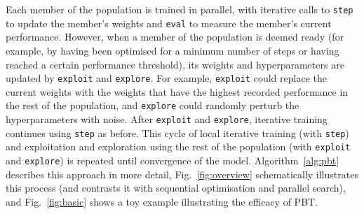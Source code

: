 \documentclass{article} %
\newcommand{\figref}[1]{Fig.~\ref{#1}}
\newcommand{\pbtexploit}{\texttt{exploit}\xspace}
\newcommand{\pbtexplore}{\texttt{explore}\xspace}
\newcommand{\pbtstep}{\texttt{step}\xspace}
\newcommand{\pbteval}{\texttt{eval}\xspace}
\begin{document}
Each member of the population is trained in parallel, with iterative calls to \pbtstep to update the member's weights and \pbteval to measure the member's current performance. However, when a member of the population is deemed ready (for example, by having been optimised for a minimum number of steps or having reached a certain performance threshold), its weights and hyperparameters are updated by \pbtexploit and \pbtexplore. For example, \pbtexploit could replace the current weights with the weights that have the highest recorded performance in the rest of the population, and \pbtexplore could randomly perturb the hyperparameters with noise. After \pbtexploit and \pbtexplore, iterative training continues using \pbtstep as before. This cycle of local iterative training (with \pbtstep) and exploitation and exploration using the rest of the population (with \pbtexploit and \pbtexplore) is repeated until convergence of the model. Algorithm~\ref{alg:pbt} describes this approach in more detail, \figref{fig:overview} schematically illustrates this process (and contrasts it with sequential optimisation and parallel search), and \figref{fig:basic} shows a toy example illustrating the efficacy of PBT.
\end{document}
